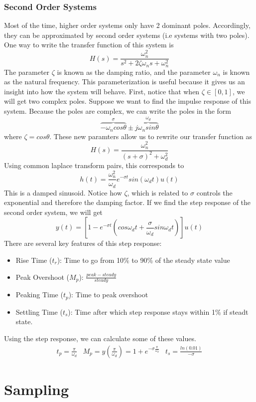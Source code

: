 \documentclass{article}
\begin{document}
\subsubsection{Second Order Systems}
Most of the time, higher order systems only have 2 dominant poles. Accordingly, they can be approximated by second order systems (i.e systems with two poles).
One way to write the transfer function of this system is
$$H(s)=\frac{\omega_n^2}{s^2+2\zeta\omega_ns+\omega_n^2}$$
The parameter $\zeta$ is known as the damping ratio, and the parameter $\omega_n$ is known as the natural frequency.
This parameterization is useful because it gives us an insight into how the system will behave. First, notice that when
$\zeta \in [0, 1]$, we will get two complex poles. Suppose we want to find the impulse response of this system. Because the poles are complex, 
we can write the poles in the form
$$\overbrace{-\omega_ncos\theta}^{\sigma} \pm j\overbrace{\omega_nsin\theta}^{\omega_d}$$
where $\zeta=cos\theta$. These new paramters allow us to rewrite our transfer function as
$$H(s) = \frac{\omega_n^2}{(s+\sigma)^2+\omega_d^2}$$
Using common laplace transform pairs, this corresponds to
$$h(t) = \frac{\omega_n^2}{\omega_d}e^{-\sigma t}sin(\omega_dt)u(t)$$
This is a damped sinusoid. Notice how $\zeta$, which is related to $\sigma$ controls the exponential and therefore the damping factor.
If we find the step response of the second order system, we will get
$$y(t) = \left[1-e^{-\sigma t}\left(cos\omega_dt+\frac{\sigma}{\omega_d}sin\omega_dt\right)\right]u(t)$$
There are several key features of this step response:
\begin{itemize}
    \item Rise Time ($t_r$): Time to go from 10\% to 90\% of the steady state value
    \item Peak Overshoot ($M_p$): $\frac{peak - steady}{steady}$
    \item Peaking Time ($t_p$): Time to peak overshoot
    \item Settling Time ($t_s$): Time after which step response stays within 1\% if steadt state.
\end{itemize}
Using the step response, we can calculate some of these values.
\[
    \begin{array}{ccc}
        t_p=\frac{\pi}{\omega_d} & M_p=y\left(\frac{\pi}{\omega_d}\right)=1+e^{-\sigma\frac{\pi}{\omega_d}} & t_s = \frac{ln(0.01)}{-\sigma}
    \end{array}
\]
\section{Sampling}
\end{document}
